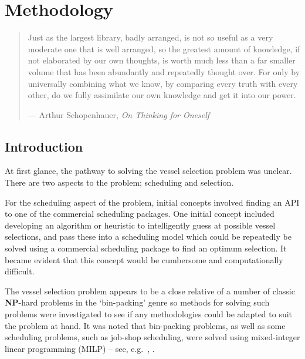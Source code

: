 %
%
%
%

\chapter{Methodology}\label{C.methodology}

\begin{quote}
Just as the largest library, badly arranged, is not so useful as a very
moderate one that is well arranged, so the greatest amount of knowledge, if not
elaborated by our own thoughts, is worth much less than a far smaller volume
that has been abundantly and repeatedly thought over.  For only by universally
combining what we know, by comparing every truth with every other, do we fully
assimilate our own knowledge and get it into our power.

\hspace{2cm}--- Arthur Schopenhauer, \emph{On Thinking for Oneself}
\end{quote}

\section{Introduction}\label{S.intro4}
At first glance, the pathway to solving the vessel selection problem was
unclear.
There are two aspects to the problem; scheduling and selection.

For the scheduling aspect of the problem, initial concepts involved finding an
API to one of the commercial scheduling packages.
One initial concept included developing an algorithm or heuristic to
intelligently guess at possible vessel selections, and pass these into a
scheduling model which could be repeatedly be solved using a commercial
scheduling package to find an optimum selection.
It became evident that this concept would be cumbersome and computationally
difficult.

The vessel selection problem appears to be a close relative of a number of
classic \textbf{NP}-hard problems in the `bin-packing' genre so methods for
solving such problems were investigated to see if any methodologies could be
adapted to suit the problem at hand.
It was noted that bin-packing problems, as well as some scheduling problems,
such as job-shop scheduling, were solved using mixed-integer linear
programming (MILP) -- see, e.g.\ \citet{Martello:1990}, \citet{Taha:2017}.

